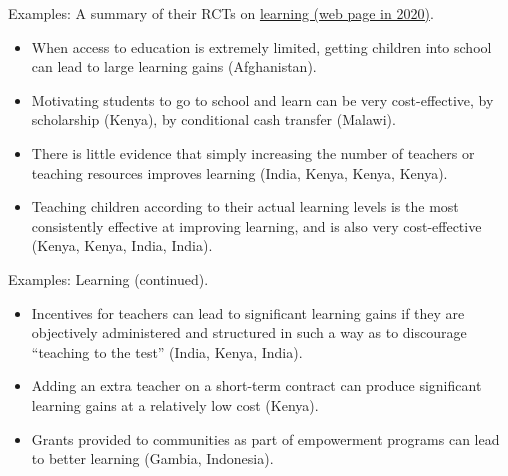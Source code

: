 \begin{frame}{}
Examples: A summary of their RCTs on \href{https://www.povertyactionlab.org/policy-lessons/education/increasing-test-score-performance}{learning (web page in 2020)}.
\begin{itemize}[<+->]
\vspace{1.0ex}\setlength{\itemsep}{1.0ex}\setlength{\baselineskip}{12pt}
\item	When access to education is extremely limited, getting children into school can lead to large learning gains (Afghanistan).
\item	Motivating students to go to school and learn can be very cost-effective, by scholarship (Kenya), by conditional cash transfer (Malawi).
\item	There is little evidence that simply increasing the number of teachers or teaching resources improves learning (India, Kenya, Kenya, Kenya). 
\item	Teaching children according to their actual learning levels is the most consistently effective at improving learning, and is also very cost-effective (Kenya, Kenya, India, India).
\end{itemize}
\end{frame}

\begin{frame}{}
Examples: Learning (continued).
\begin{itemize}
\vspace{1.0ex}\setlength{\itemsep}{1.0ex}\setlength{\baselineskip}{12pt}
\item	Incentives for teachers can lead to significant learning gains if they are objectively administered and structured in such a way as to discourage ``teaching to the test'' (India, Kenya, India).
\item	Adding an extra teacher on a short-term contract can produce significant learning gains at a relatively low cost (Kenya).
\item	Grants provided to communities as part of empowerment programs can lead to better learning (Gambia, Indonesia).
\end{itemize}
\end{frame}


